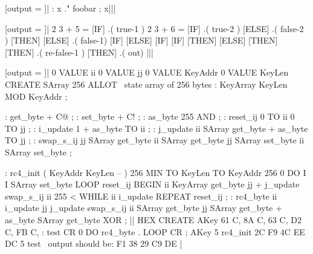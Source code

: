 [output = \result]|
  : x ." foobar
  ; x|||
\typeout{\result}

[output = \result]|
  2 3 + 5 =
  [IF]
    .( true-1 )
    2 3 + 6 =
    [IF] .( true-2 ) [ELSE] .( false-2 ) [THEN]
  [ELSE]
    .( false-1)
    [IF] [ELSE] [IF] [IF] [THEN] [ELSE] [THEN] [THEN]
    .( re-false-1 )
  [THEN]
  .( out)
|||
\typeout{\result}

[output = \result]|
  0 VALUE ii        0 VALUE jj
  0 VALUE KeyAddr   0 VALUE KeyLen
  CREATE SArray   256 ALLOT   \ state array of 256 bytes
  : KeyArray      KeyLen MOD   KeyAddr ;

  : get_byte      + C@ ;
  : set_byte      + C! ;
  : as_byte       255 AND ;
  : reset_ij      0 TO ii   0 TO jj ;
  : i_update      1 +   as_byte TO ii ;
  : j_update      ii SArray get_byte +   as_byte TO jj ;
  : swap_s_ij
      jj SArray get_byte
         ii SArray get_byte  jj SArray set_byte
      ii SArray set_byte
  ;

  : rc4_init ( KeyAddr KeyLen -- )
      256 MIN TO KeyLen   TO KeyAddr
      256 0 DO   I I SArray set_byte   LOOP
      reset_ij
      BEGIN
          ii KeyArray get_byte   jj +  j_update
          swap_s_ij
          ii 255 < WHILE
          ii i_update
      REPEAT
      reset_ij
  ;
  : rc4_byte
      ii i_update   jj j_update
      swap_s_ij
      ii SArray get_byte   jj SArray get_byte +   as_byte SArray get_byte  XOR
  ;
||
  HEX
  CREATE AKey   61 C, 8A C, 63 C, D2 C, FB C,
  : test   CR   0 DO  rc4_byte . LOOP  CR ;
  AKey 5 rc4_init
  2C F9 4C EE DC  5 test   \ output should be: F1 38 29 C9 DE
|
\typeout{\result}

\stop